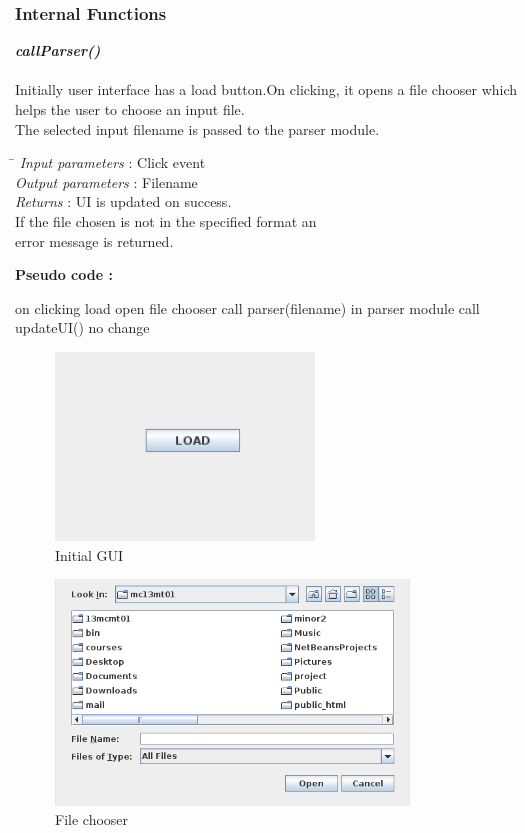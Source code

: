 ﻿\documentclass[a4paper,11pt]{article}
\begin{document}
\subsubsection{Internal Functions}
\emph{\bf callParser()}\\\\
Initially user interface has a load button.On clicking, it opens a file chooser which helps  the user to choose an input file.
\\ 
The selected input filename is passed to the parser module. \\
\begin{tabbing}
\hspace*{4cm}\= \kill
\emph{Input parameters} \>: Click event \\
\emph{Output parameters} \>: Filename \\
\emph{Returns} \>: UI is updated on success.\\ \>If the file chosen is not in the  specified format an\\ \> error message is returned.\\
\end{tabbing}
\textbf{Pseudo code :}
\begin{algorithmic}[1]
 \STATE on clicking load
 \STATE open file chooser
  \STATE call parser(filename) in parser module
  \STATE call updateUI()
  \ELSE 
  \STATE no change
  \ENDIF
 \end{algorithmic}
\begin{figure}[ht!]
\centering
\includegraphics[height=5cm]{1.png}
\caption{Initial GUI}
\end{figure}
\begin{figure}[h]
\centering
\includegraphics[height=6cm]{2.png}
\caption{File chooser}
\end{figure}
\end{document}
